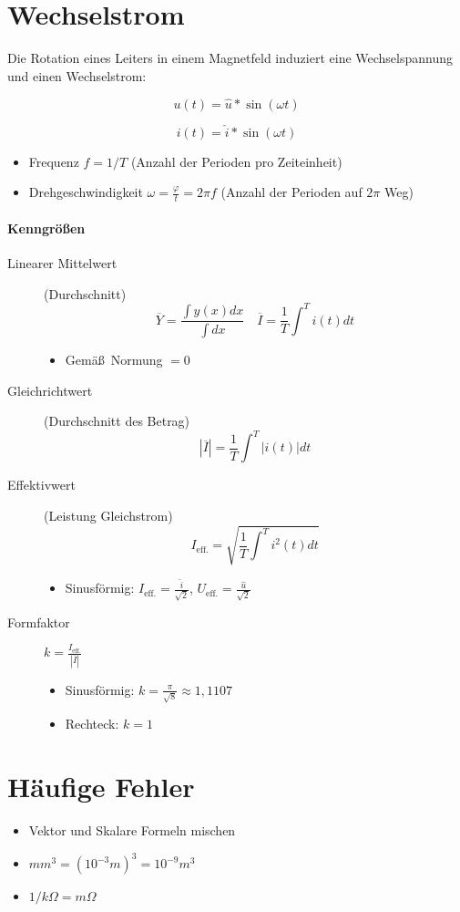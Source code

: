 \section{Wechselstrom}

Die Rotation eines Leiters in einem Magnetfeld induziert eine Wechselspannung und einen Wechselstrom:

$$u(t) = \hat{u} * \sin(\omega t)$$

$$i(t) = \hat{i} * \sin(\omega t)$$

\begin{itemize}
  \item Frequenz $f = 1/T$ (Anzahl der Perioden pro Zeiteinheit)
  \item Drehgeschwindigkeit $\omega = \frac{\varphi}{t} = 2 \pi f$ (Anzahl der Perioden auf $2\pi$ Weg)
\end{itemize}

\paragraph{Kenngrö\ss en}

\begin{description}
  \item[Linearer Mittelwert] (Durchschnitt)
    $$\overline{Y} = \frac{\int y(x)dx}{\int dx} \quad \overline{I} = \frac{1}{T} \int^T i(t) dt$$

    \begin{itemize}
      \item Gemä\ss~Normung $= 0$
    \end{itemize}

  \item[Gleichrichtwert] (Durchschnitt des Betrag)
    $$|\overline{I}| = \frac{1}{T} \int^T |i(t)| dt$$

  \item[Effektivwert] (Leistung Gleichstrom)
    $$I_\text{eff.} = \sqrt{\frac{1}{T} \int^T i^2(t) dt} $$

    \begin{itemize}
      \item Sinusförmig: $I_\text{eff.} = \frac{\hat{i}}{\sqrt{2}}$, $U_\text{eff.} = \frac{\hat{u}}{\sqrt{2}}$
    \end{itemize}

  \item[Formfaktor] $k = \frac{I_\text{eff.}}{|\overline{I}|}$

    \begin{itemize}
      \item Sinusförmig: $k = \frac{\pi}{\sqrt{8}} \approx 1,1107$
      \item Rechteck: $k = 1$
    \end{itemize}
\end{description}

\section{Häufige Fehler}

\begin{itemize}
  \item Vektor und Skalare Formeln mischen
  \item $mm^3 = (10^{-3} m)^3 = 10^{-9} m^3$
  \item $1/k\Omega = m\Omega$
\end{itemize}